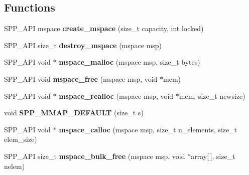 \subsection*{Functions}
\begin{DoxyCompactItemize}
\item 
S\+P\+P\+\_\+\+A\+PI mspace {\bfseries create\+\_\+mspace} (size\+\_\+t capacity, int locked)\hypertarget{namespacespp_a3b2518bbede658434360cb16ef86e78c}{}\label{namespacespp_a3b2518bbede658434360cb16ef86e78c}

\item 
S\+P\+P\+\_\+\+A\+PI size\+\_\+t {\bfseries destroy\+\_\+mspace} (mspace msp)\hypertarget{namespacespp_ac5c484c4b99298f3874bd87175e5650e}{}\label{namespacespp_ac5c484c4b99298f3874bd87175e5650e}

\item 
S\+P\+P\+\_\+\+A\+PI void $\ast$ {\bfseries mspace\+\_\+malloc} (mspace msp, size\+\_\+t bytes)\hypertarget{namespacespp_acfe07dadf48ebe9a83664ee8e8d9fb08}{}\label{namespacespp_acfe07dadf48ebe9a83664ee8e8d9fb08}

\item 
S\+P\+P\+\_\+\+A\+PI void {\bfseries mspace\+\_\+free} (mspace msp, void $\ast$mem)\hypertarget{namespacespp_a2568792c046eeaa1f4f4cce080865c47}{}\label{namespacespp_a2568792c046eeaa1f4f4cce080865c47}

\item 
S\+P\+P\+\_\+\+A\+PI void $\ast$ {\bfseries mspace\+\_\+realloc} (mspace msp, void $\ast$mem, size\+\_\+t newsize)\hypertarget{namespacespp_a052e99d014bfd106bd7dfaa9f080909b}{}\label{namespacespp_a052e99d014bfd106bd7dfaa9f080909b}

\item 
void {\bfseries S\+P\+P\+\_\+\+M\+M\+A\+P\+\_\+\+D\+E\+F\+A\+U\+LT} (size\+\_\+t s)\hypertarget{namespacespp_addae441b9d1804cc67eb07b0fb664e7b}{}\label{namespacespp_addae441b9d1804cc67eb07b0fb664e7b}

\item 
S\+P\+P\+\_\+\+A\+PI void $\ast$ {\bfseries mspace\+\_\+calloc} (mspace msp, size\+\_\+t n\+\_\+elements, size\+\_\+t elem\+\_\+size)\hypertarget{namespacespp_a9a9476d3e3c101c59e6036f61da67aca}{}\label{namespacespp_a9a9476d3e3c101c59e6036f61da67aca}

\item 
S\+P\+P\+\_\+\+A\+PI size\+\_\+t {\bfseries mspace\+\_\+bulk\+\_\+free} (mspace msp, void $\ast$array\mbox{[}$\,$\mbox{]}, size\+\_\+t nelem)\hypertarget{namespacespp_a494744e0dfc005f9f70e71e33357cf80}{}\label{namespacespp_a494744e0dfc005f9f70e71e33357cf80}


\end{DoxyCompactItemize}
